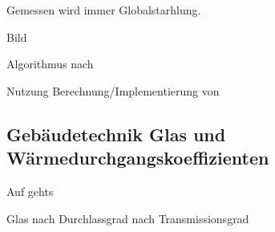 Gemessen wird immer Globalstarhlung.

\cite{therakles13}
\cite[S.~63ff.]{qu11}
\cite[S.~61ff.]{ka13}
\cite[S.~315ff.]{ha13} Bild

Algorithmus nach \cite{re08}

Nutzung Berechnung/Implementierung von \cite{pysolar}

\subsection{Gebäudetechnik Glas und Wärmedurchgangskoeffizienten}
Auf gehts

Glas nach \cite[S.~61ff.]{ha13}
Durchlassgrad nach \cite[S.~604ff.]{ha13}
Transmissionsgrad 


